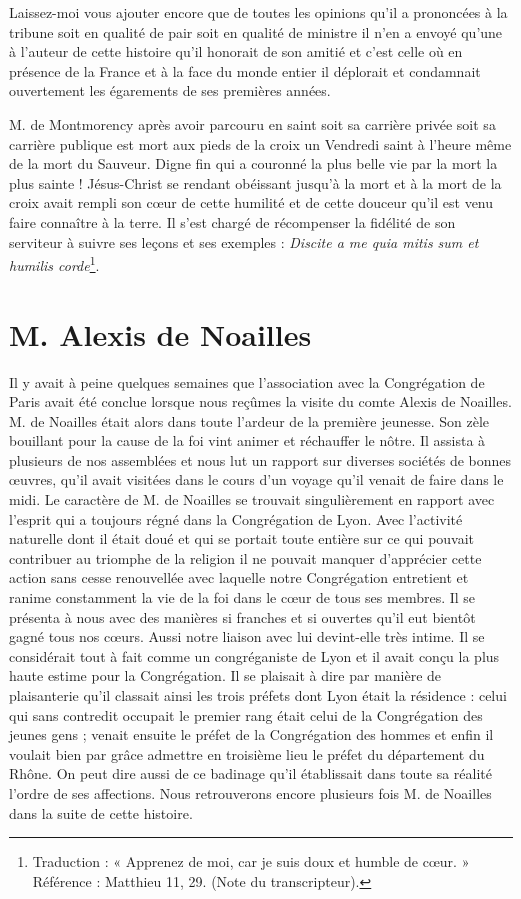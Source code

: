 Laissez-moi vous ajouter encore que de toutes les opinions qu'il a prononcées à la tribune soit en qualité de pair soit en qualité de ministre il n'en a envoyé qu'une à l'auteur de cette histoire qu'il honorait de son amitié et c'est celle où en présence de la France et à la face du monde entier il déplorait et condamnait ouvertement les égarements de ses premières années.

M. de Montmorency après avoir parcouru en saint soit sa carrière privée soit sa carrière publique est mort aux pieds de la croix un Vendredi saint à l'heure même de la mort du Sauveur. Digne fin qui a couronné la plus belle vie par la mort la plus sainte ! Jésus-Christ se rendant obéissant jusqu'à la mort et à la mort de la croix avait rempli son cœur de cette humilité et de cette douceur qu'il est venu faire connaître à la terre. Il s'est chargé de récompenser la fidélité de son serviteur à suivre ses leçons et ses exemples : \textit{Discite a me quia mitis sum et humilis corde}\footnote{Traduction : « Apprenez de moi, car je suis doux et humble de cœur. » Référence : Matthieu 11, 29. (Note du transcripteur).}.

\section*{M. Alexis de Noailles}
Il y avait à peine quelques semaines que l'association avec la Congrégation de Paris avait été conclue lorsque nous reçûmes la visite du comte Alexis de Noailles. M. de Noailles était alors dans toute l'ardeur de la première jeunesse. Son zèle bouillant pour la cause de la foi vint animer et réchauffer le nôtre. Il assista à plusieurs de nos assemblées et nous lut un rapport sur diverses sociétés de bonnes œuvres,
qu'il avait visitées dans le cours d'un voyage qu'il venait de faire dans le midi. Le caractère de M. de Noailles se trouvait singulièrement en rapport avec l'esprit qui a toujours régné dans la Congrégation de Lyon. Avec l'activité naturelle dont il était doué et qui se portait toute entière sur ce qui pouvait contribuer au triomphe de la religion il ne pouvait manquer d'apprécier cette action sans cesse renouvellée avec laquelle notre Congrégation entretient et ranime constamment la vie de la foi dans le cœur de tous ses membres. Il se présenta à nous avec des manières si franches et si ouvertes qu'il eut bientôt gagné tous nos cœurs. Aussi notre liaison avec lui devint-elle très intime. Il se considérait tout à fait comme un congréganiste de Lyon et il avait conçu la plus haute estime pour la Congrégation. Il se plaisait à dire par manière de plaisanterie qu'il classait ainsi les trois préfets dont Lyon était la résidence : celui qui sans contredit occupait le premier rang était celui de la Congrégation des jeunes gens ; venait ensuite le préfet de la Congrégation des hommes et enfin il voulait bien par grâce admettre en troisième lieu le préfet du département du Rhône. On peut dire aussi de ce badinage qu'il établissait dans toute sa réalité l'ordre de ses affections. Nous retrouverons encore plusieurs fois M. de Noailles dans la suite de cette histoire.

